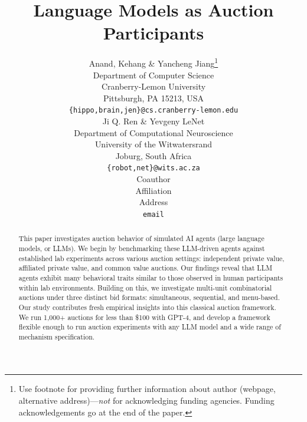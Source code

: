 \documentclass{article} %
\title{Language Models as Auction Participants }
\author{Anand, Kehang \& Yancheng Jiang\thanks{ Use footnote for providing further information
about author (webpage, alternative address)---\emph{not} for acknowledging
funding agencies.  Funding acknowledgements go at the end of the paper.} \\
Department of Computer Science\\
Cranberry-Lemon University\\
Pittsburgh, PA 15213, USA \\
\texttt{\{hippo,brain,jen\}@cs.cranberry-lemon.edu} \\
\And
Ji Q. Ren \& Yevgeny LeNet \\
Department of Computational Neuroscience \\
University of the Witwatersrand \\
Joburg, South Africa \\
\texttt{\{robot,net\}@wits.ac.za} \\
\AND
Coauthor \\
Affiliation \\
Address \\
\texttt{email}
}
\begin{document}
\maketitle

\begin{abstract}
This paper investigates auction behavior of simulated AI agents (large language models, or LLMs). 
We begin by benchmarking these LLM-driven agents against established lab experiments across various auction settings: independent private value, affiliated private value, and common value auctions. 
Our findings reveal that LLM agents exhibit many behavioral traits similar to those observed in human participants within lab environments.
Building on this, we investigate multi-unit combinatorial auctions under three distinct bid formats: simultaneous, sequential, and menu-based. 
Our study contributes fresh empirical insights into this classical auction framework.
We run 1,000+ auctions for less than \$100 with GPT-4, and develop a framework flexible enough to run auction experiments with any LLM model and a wide range of mechanism  specification. 

\end{abstract}
\end{document}
